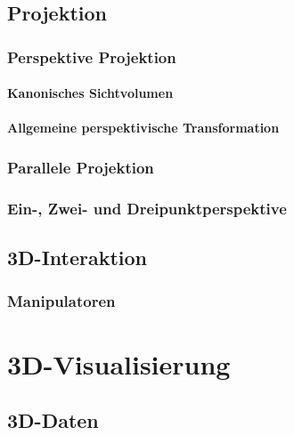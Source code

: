 \documentclass[a4paper, 11pt, accentcolor = tud3b]{tudreport}
\begin{document}
		\section{Projektion} %

			\subsection{Perspektive Projektion} %

				\subsubsection{Kanonisches Sichtvolumen} %

				\subsubsection{Allgemeine perspektivische Transformation} %

			\subsection{Parallele Projektion} %

			\subsection{Ein-, Zwei- und Dreipunktperspektive} %

		\section{3D-Interaktion} %

			\subsection{Manipulatoren} %

	\chapter{3D-Visualisierung} %

		\section{3D-Daten} %
\end{document}
